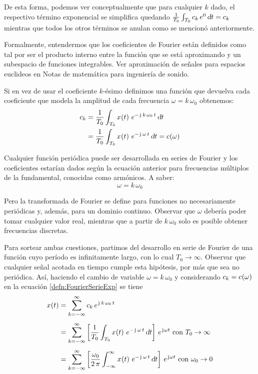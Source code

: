 De esta forma, podemos ver conceptualmente que para cualquier $k$ dado, el respectivo término exponencial se simplifica quedando $\frac{1}{T_0} \int_{T_0} c_k \, e^0 \, \dif t = c_k$ mientras que todos los otros términos se anulan como se mencionó anteriormente.

Formalmente, entendermos que los coeficientes de Fourier están definidos como tal por ser el producto interno entre la función que se está aproximando y un subespacio de funciones integrables.
Ver aproximación de señales para espacios euclideos en Notas de matemática para ingeniería de sonido.

Si en vez de usar el coeficiente $k$-ésimo definimos una función que devuelva cada coeficiente que modela la amplitud de cada frecuencia $\omega = k \, \omega_0$ obtenemos:
\begin{align*}
    c_\kth &= \frac{1}{T_0} \int_{T_0} \fx[x]{t} \, e^{-\iu \, \kth \, \omega_0 \, t} \, \dif t
    \\
    &= \frac{1}{T_0} \int_{T_0} \fx[x]{t} \, e^{-\iu \, \omega \, t} \, \dif t = \fx[c]{\omega}
\end{align*}

Cualquier función periódica puede ser desarrollada en series de Fourier y los coeficientes estarían dados según la ecuación anterior para frecuencias múltiplos de la fundamental, conocidas como armónicos.
A saber:
\begin{equation*}
    \omega = k \, \omega_0
\end{equation*}

Pero la transformada de Fourier se define para funciones no necesariamente periódicas y, además, para un dominio continuo.
Observar que $\omega$ debería poder tomar cualquier valor real, mientras que a partir de $k \, \omega_0$ solo es posible obtener frecuencias discretas.

Para sortear ambas cuestiones, partimos del desarrollo en serie de Fourier de una función cuyo período es infinitamente largo, con lo cual $T_0 \to \infty$.
Observar que cualquier señal acotada en tiempo cumple esta hipótesis, por más que sea no periódica.
Así, haciendo el cambio de variable $\omega = k \, \omega_0$ y considerando $c_k = \fx[c]{\omega}$ en la ecuación \ref{defn:FourierSerieExp} se tiene
\begin{align*}
    \fx[x]{t} &= \sum_{\kth=-\infty}^\infty c_\kth \, e^{\iu \, \kth \, \omega_0 \, t}
    \\[1ex]
    &= \sum_{\kth=-\infty}^\infty \left[ \frac{1}{T_0} \int_{T_0} \fx[x]{t} \, e^{-\iu \, \omega \, t} \, \dif t \right] \, \complexExp \text{ con } T_0 \to \infty
    \\[1ex]
    &= \sum_{\kth=-\infty}^\infty \left[ \frac{\omega_0}{2 \, \pi} \int_{-\infty}^{\infty} \fx[x]{t} \, e^{-\iu \, \omega \, t} \, \dif t \right] \, \complexExp \text{ con } \omega_0 \to 0
\end{align*}

